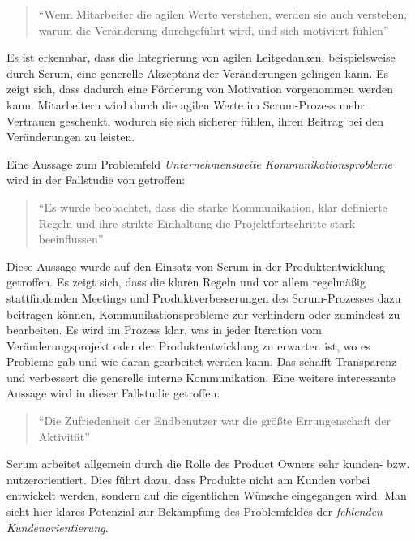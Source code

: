 \begin{quote}
	``Wenn Mitarbeiter die agilen Werte verstehen, werden sie auch verstehen, warum die Veränderung durchgeführt wird, und sich motiviert fühlen'' \cite[S. 17]{dikert_challenges_2016}
\end{quote}

Es ist erkennbar, dass die Integrierung von agilen Leitgedanken, beispielsweise durch Scrum, eine generelle Akzeptanz der Veränderungen gelingen kann. Es zeigt sich, dass dadurch eine Förderung von Motivation vorgenommen werden kann. Mitarbeitern wird durch die agilen Werte im Scrum-Prozess mehr Vertrauen geschenkt, wodurch sie sich sicherer fühlen, ihren Beitrag bei den Veränderungen zu leisten.

Eine Aussage zum Problemfeld \textit{Unternehmensweite Kommunikationsprobleme} wird in der Fallstudie von  getroffen:

\begin{quote}
	``Es wurde beobachtet, dass die starke Kommunikation, klar definierte Regeln und ihre strikte Einhaltung die Projektfortschritte stark beeinflussen'' \cite[S. 4]{alawairdhi_agile_2016}
\end{quote}

Diese Aussage wurde auf den Einsatz von Scrum in der Produktentwicklung getroffen. Es zeigt sich, dass die klaren Regeln und vor allem regelmäßig stattfindenden Meetings und Produktverbesserungen des Scrum-Prozesses dazu beitragen können, Kommunikationsprobleme zur verhindern oder zumindest zu bearbeiten. Es wird im Prozess klar, was in jeder Iteration vom Veränderungsprojekt oder der Produktentwicklung zu erwarten ist, wo es Probleme gab und wie daran gearbeitet werden kann. Das schafft Transparenz und verbessert die generelle interne Kommunikation. Eine weitere interessante Aussage wird in dieser Fallstudie getroffen:

\begin{quote}
	``Die Zufriedenheit der Endbenutzer war die größte Errungenschaft der Aktivität'' \cite[S. 4]{alawairdhi_agile_2016}
\end{quote}

Scrum arbeitet allgemein durch die Rolle des Product Owners sehr kunden- bzw. nutzerorientiert. Dies führt dazu, dass Produkte nicht am Kunden vorbei entwickelt  werden, sondern auf die eigentlichen Wünsche eingegangen wird. Man sieht hier klares Potenzial  zur Bekämpfung des  Problemfeldes der \textit{fehlenden Kundenorientierung}.

